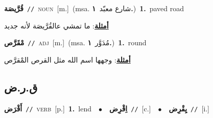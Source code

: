 \documentclass[10pt,a4paper,twoside]{article} %
\begin{document}
\begin{multicols}{2}
{\setlength\topsep{0pt}\textbf{\foreignlanguage{arabic}{قُرَّيصَة}}\ {\color{gray}\texttt{//}\color{black}}\ \textsc{noun}\ [m.]\ \color{gray}(msa. \foreignlanguage{arabic}{شارع معبّد}~\foreignlanguage{arabic}{\textbf{١.}})\color{black}\ \textbf{1.}~paved road\  \begin{flushright}\color{gray}\foreignlanguage{arabic}{\textbf{\underline{\foreignlanguage{arabic}{أمثلة}}}: ما تمشي عالقُرَّيصَة لأنه جديد}\end{flushright}\color{black}} \vspace{2mm}

{\setlength\topsep{0pt}\textbf{\foreignlanguage{arabic}{مْقَرَّص}}\ {\color{gray}\texttt{//}\color{black}}\ \textsc{adj}\ [m.]\ \color{gray}(msa. \foreignlanguage{arabic}{مُدَوَّر}~\foreignlanguage{arabic}{\textbf{١.}})\color{black}\ \textbf{1.}~round\  \begin{flushright}\color{gray}\foreignlanguage{arabic}{\textbf{\underline{\foreignlanguage{arabic}{أمثلة}}}: وجهها اسم الله مثل القرص المْقرَّص}\end{flushright}\color{black}} \vspace{2mm}

\vspace{-3mm}
\subsection*{\color{blue}\foreignlanguage{arabic}{ق.ر.ض}\color{blue}{}} 

{\setlength\topsep{0pt}\textbf{\foreignlanguage{arabic}{أَقْرَض}}\ {\color{gray}\texttt{//}\color{black}}\ \textsc{verb}\ [p.]\ \textbf{1.}~lend\ \ $\bullet$\ \ \setlength\topsep{0pt}\textbf{\foreignlanguage{arabic}{اِقْرِض}}\ {\color{gray}\texttt{//}\color{black}}\ [c.]\ \ $\bullet$\ \ \setlength\topsep{0pt}\textbf{\foreignlanguage{arabic}{يِقْرِض}}\ {\color{gray}\texttt{//}\color{black}}\ [i.]\ } \vspace{2mm}


\end{multicols}
\end{document}
